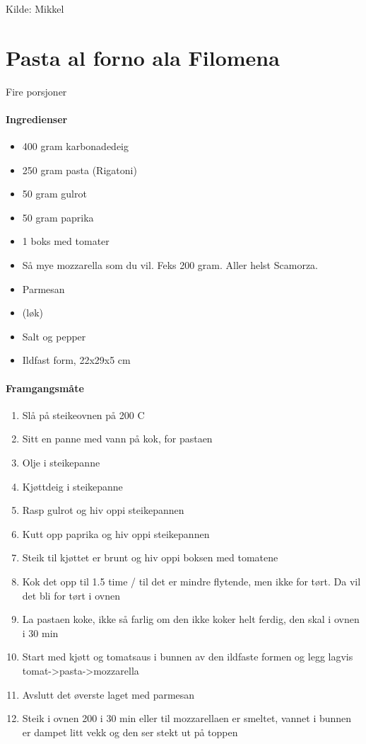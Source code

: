 \documentclass[12pt,a4paper]{book}
\begin{document}
{Kilde: Mikkel
\clearpage{}
\clearpage{}\section{﻿Pasta al forno ala Filomena}

Fire porsjoner

\paragraph{Ingredienser}
\begin{itemize}[noitemsep]
	\item 400 gram karbonadedeig
	\item 250 gram pasta (Rigatoni)
	\item 50 gram gulrot
	\item 50 gram paprika
	\item 1 boks med tomater
	\item Så mye mozzarella som du vil. Feks 200 gram. Aller helst Scamorza.
	\item Parmesan
	\item (løk)
	\item Salt og pepper
	\item Ildfast form, 22x29x5 cm
\end{itemize}

\paragraph{Framgangsmåte}
\begin{enumerate}[noitemsep]
	\item Slå på steikeovnen på 200 \degree C
	\item Sitt en panne med vann på kok, for pastaen
	\item Olje i steikepanne
	\item Kjøttdeig i steikepanne
	\item Rasp gulrot og hiv oppi steikepannen
	\item Kutt opp paprika og hiv oppi steikepannen
	\item Steik til kjøttet er brunt og hiv oppi boksen med tomatene
	\item Kok det opp til 1.5 time / til det er mindre flytende, men ikke for tørt. Da vil det bli for tørt i ovnen
	\item La pastaen koke, ikke så farlig om den ikke koker helt ferdig, den skal i ovnen i 30 min
	\item Start med kjøtt og tomatsaus i bunnen av den ildfaste formen og legg lagvis tomat->pasta->mozzarella
	\item Avslutt det øverste laget med parmesan
	\item Steik i ovnen 200 i 30 min eller til mozzarellaen er smeltet, vannet i bunnen er dampet litt vekk og den ser stekt ut på toppen
\end{enumerate}


}
\end{document}
